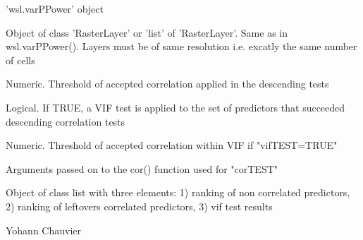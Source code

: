 \documentclass[a4paper]{book}
\begin{document}
%
\begin{Arguments}
\begin{ldescription}
\item[\code{PPower.object}] 'wsl.varPPower' object

\item[\code{ras}] Object of class 'RasterLayer' or 'list' of 'RasterLayer'. Same as in wsl.varPPower().
Layers must be of same resolution i.e. excatly the same number of cells

\item[\code{corTEST}] Numeric. Threshold of accepted correlation applied in the descending tests

\item[\code{vifTEST}] Logical. If TRUE, a VIF test is applied to the set of predictors that succeeded
descending correlation tests

\item[\code{corVIF}] Numeric. Threshold of accepted correlation within VIF if "vifTEST=TRUE"

\item[\code{...}] Arguments passed on to the cor() function used for "corTEST"
\end{ldescription}
\end{Arguments}
%
\begin{Value}
Object of class list with three elements: 1) ranking of non correlated predictors,
2) ranking of leftovers correlated predictors, 3) vif test results
\end{Value}
%
\begin{Author}\relax
Yohann Chauvier
\end{Author}
%
\end{document}
